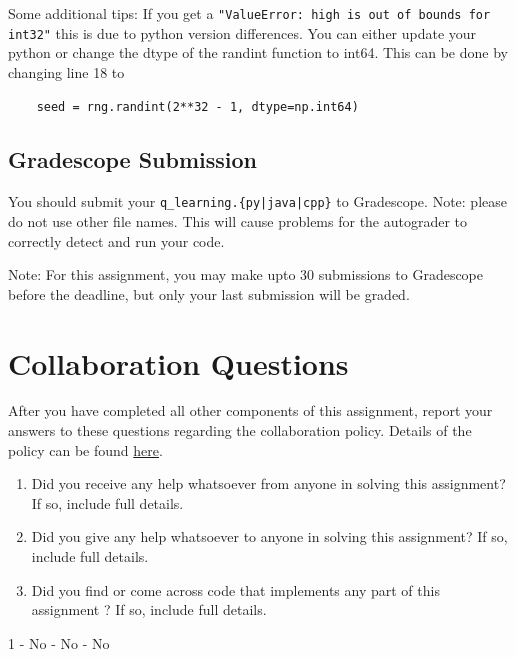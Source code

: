 \documentclass[11pt,addpoints,answers]{exam}
\begin{document}
Some additional tips: If you get a \texttt{"ValueError: high is out of bounds for int32"} this is due to python version differences. You can either update your python or change the dtype of the randint function to int64. This can be done by changing line 18 to
\begin{verbatim}
    seed = rng.randint(2**32 - 1, dtype=np.int64)
\end{verbatim}


\subsection{Gradescope Submission}

You should submit your \texttt{q\_learning.\{py|java|cpp\}} to Gradescope.
Note: please do not use other file names. This will cause problems for the autograder to correctly detect and run your code.

Note: For this assignment, you may make upto 30 submissions to Gradescope before the deadline, but only your last submission will be graded.

\newpage
\section{Collaboration Questions}
After you have completed all other components of this assignment, report your answers to these questions regarding the collaboration policy. Details of the policy can be found \href{http://www.cs.cmu.edu/~mgormley/courses/10601/syllabus.html}{here}.
\begin{enumerate}
    \item Did you receive any help whatsoever from anyone in solving this assignment? If so, include full details.
    \item Did you give any help whatsoever to anyone in solving this assignment? If so, include full details.
    \item Did you find or come across code that implements any part of this assignment ? If so, include full details.
\end{enumerate}

\begin{your_solution}[height=6cm]
1 - No  - No  - No \newline

\end{your_solution}
\end{document}
